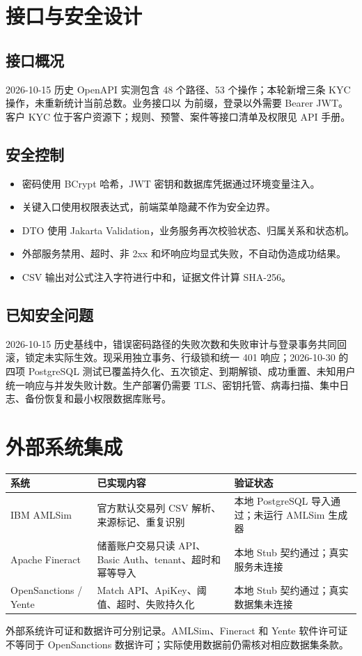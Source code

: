 \documentclass[UTF8,openany,zihao=-4]{ctexrep}
\begin{document}
\chapter{接口与安全设计}
\section{接口概况}
2026-10-15 历史 OpenAPI 实测包含 48 个路径、53 个操作；本轮新增三条 KYC 操作，未重新统计当前总数。业务接口以  为前缀，登录以外需要 Bearer JWT。客户 KYC 位于客户资源下；规则、预警、案件等接口清单及权限见 API 手册。

\section{安全控制}
\begin{itemize}
\item 密码使用 BCrypt 哈希，JWT 密钥和数据库凭据通过环境变量注入。
\item 关键入口使用权限表达式，前端菜单隐藏不作为安全边界。
\item DTO 使用 Jakarta Validation，业务服务再次校验状态、归属关系和状态机。
\item 外部服务禁用、超时、非 2xx 和坏响应均显式失败，不自动伪造成功结果。
\item CSV 输出对公式注入字符进行中和，证据文件计算 SHA-256。
\end{itemize}

\section{已知安全问题}
2026-10-15 历史基线中，错误密码路径的失败次数和失败审计与登录事务共同回滚，锁定未实际生效。现采用独立事务、行级锁和统一 401 响应；2026-10-30 的四项 PostgreSQL 测试已覆盖持久化、五次锁定、到期解锁、成功重置、未知用户统一响应与并发失败计数。生产部署仍需要 TLS、密钥托管、病毒扫描、集中日志、备份恢复和最小权限数据库账号。

\chapter{外部系统集成}
\begin{longtable}{p{}p{}p{}}
\toprule 系统 & 已实现内容 & 验证状态 \\ \midrule
IBM AMLSim & 官方默认交易列 CSV 解析、来源标记、重复识别 & 本地 PostgreSQL 导入通过；未运行 AMLSim 生成器 \\
Apache Fineract & 储蓄账户交易只读 API、Basic Auth、tenant、超时和幂等导入 & 本地 Stub 契约通过；真实服务未连接 \\
OpenSanctions / Yente & Match API、ApiKey、阈值、超时、失败持久化 & 本地 Stub 契约通过；真实数据集未连接 \\
\bottomrule
\end{longtable}
外部系统许可证和数据许可分别记录。AMLSim、Fineract 和 Yente 软件许可证不等同于 OpenSanctions 数据许可；实际使用数据前仍需核对相应数据集条款。
\end{document}
